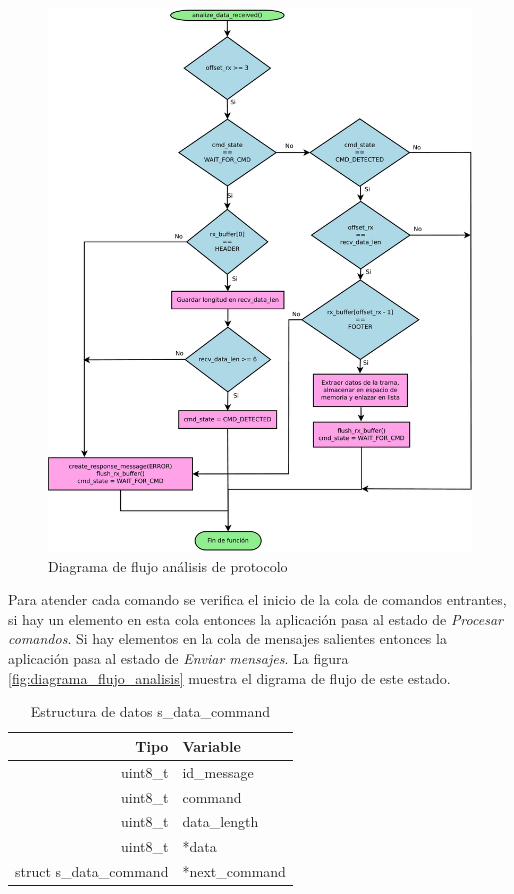 \begin{figure}
	\centering
	\includegraphics[scale=0.25]{capitulo_3_imgs/analisis_mensaje_flujo_parser.pdf}
	\caption{Diagrama de flujo análisis de protocolo}
	\label{fig:diagrama_flujo_parser}
\end{figure}

Para atender cada comando se verifica el inicio de la cola de comandos entrantes, si hay un elemento en esta cola entonces la aplicación pasa al estado de \textit{Procesar comandos}. Si hay elementos en la cola de mensajes salientes entonces la aplicación pasa al estado de \textit{Enviar mensajes}. La figura \ref{fig:diagrama_flujo_analisis} muestra el digrama de flujo de este estado. 

\begin{table}
	\begin{center}
		\caption{Estructura de datos s\_data\_command}
		\label{tabla:s_data_command}
		\small
		\begin{tabular}{r|l}
			\toprule
			\textbf{Tipo} & \textbf{Variable}\\
			\midrule
			uint8\_t & id\_message \\
			uint8\_t & command \\
			uint8\_t & data\_length \\
			uint8\_t & *data \\
			struct s\_data\_command & *next\_command\\
			\bottomrule
		\end{tabular}
	\end{center}
\end{table}

